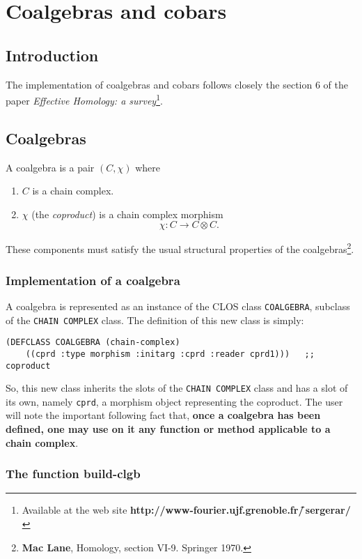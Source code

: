 \chapter{Coalgebras and cobars}

\section{Introduction}

The implementation of coalgebras and cobars follows closely the section $6$ of the paper
{\em Effective Homology: a survey}\footnote{Available
at the web site {\bf http://www-fourier.ujf.grenoble.fr/\~\,sergerar/}}.

\section{Coalgebras}

A coalgebra  is a pair $(C, \chi)$ where
\begin{enumerate}
\item $C$ is a chain complex.
\item $\chi$ (the {\em coproduct}) is a chain complex morphism
$$\chi: C \rightarrow C \otimes C.$$
\end{enumerate}
These components must satisfy the usual structural properties of the coalgebras\footnote
{{\bf Mac Lane}, Homology, section VI-9. Springer 1970.}.

\subsection {Implementation of a coalgebra}

A coalgebra  is represented as an instance
of the CLOS class {\tt COALGEBRA}, subclass
of the {\tt CHAIN COMPLEX} class. The definition of this new class is simply:
{\footnotesize\begin{verbatim}
(DEFCLASS COALGEBRA (chain-complex)
    ((cprd :type morphism :initarg :cprd :reader cprd1)))   ;; coproduct
\end{verbatim}}

So, this new class inherits the slots of the {\tt CHAIN COMPLEX} class and has a slot
of its own, namely {\tt cprd}, a morphism  object representing the coproduct. The user will note
the important following fact that, {\bf once a coalgebra has been defined, one may use on it any
function or method applicable to a chain complex}.

\subsection {The function build-clgb}


